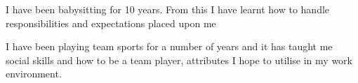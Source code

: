 

\begin{cvparagraph}
I have been babysitting for 10 years. From this I have learnt how to handle responsibilities and expectations placed upon me
\end{cvparagraph}

\begin{cvparagraph}
I have been playing team sports for a number of years and it has taught me social skills and how to be a team player, attributes I hope to utilise in my work environment.
\end{cvparagraph}
